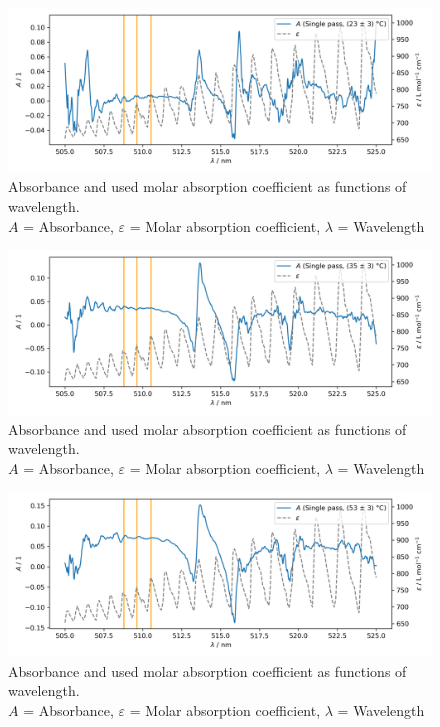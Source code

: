 \begin{figure}[H]
    \centering
    \includegraphics[width=\textwidth]{graphics/absorbance-25.png}
    \caption{Absorbance and used molar absorption coefficient as functions of wavelength.\\
        $A$ = Absorbance, $\varepsilon$ = Molar absorption coefficient, $\lambda$ = Wavelength}
    \label{fig:evaluation:absorbance:single:1}
\end{figure}

\begin{figure}[H]
    \centering
    \includegraphics[width=\textwidth]{graphics/absorbance-42.png}
    \caption{Absorbance and used molar absorption coefficient as functions of wavelength.\\
        $A$ = Absorbance, $\varepsilon$ = Molar absorption coefficient, $\lambda$ = Wavelength}
    \label{fig:evaluation:absorbance:single:2}
\end{figure}

\begin{figure}[H]
    \centering
    \includegraphics[width=\textwidth]{graphics/absorbance-60.png}
    \caption{Absorbance and used molar absorption coefficient as functions of wavelength.\\
        $A$ = Absorbance, $\varepsilon$ = Molar absorption coefficient, $\lambda$ = Wavelength}
    \label{fig:evaluation:absorbance:single:3}
\end{figure}

